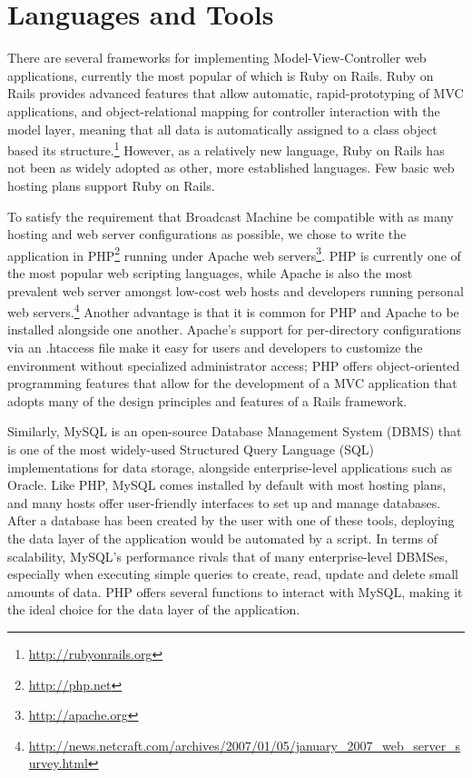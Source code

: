 \documentclass[a4paper,12pt]{report}
\begin{document}
\section{Languages and Tools}
There are several frameworks for implementing Model-View-Controller web applications, currently the most popular of which is Ruby on Rails. Ruby on Rails provides advanced features that allow automatic, rapid-prototyping of MVC applications, and object-relational mapping for controller interaction with the model layer, meaning that all data is automatically assigned to a class object based its structure.\footnote{\url{http://rubyonrails.org}} However, as a relatively new language, Ruby on Rails has not been as widely adopted as other, more established languages. Few basic web hosting plans support Ruby on Rails. 

To satisfy the requirement that Broadcast Machine be compatible with as many hosting and web server configurations as possible, we chose to write the application in PHP\footnote{\url{http://php.net}} running under Apache web servers\footnote{\url{http://apache.org}}. PHP is currently one of the most popular web scripting languages, while Apache is also the most prevalent web server amongst low-cost web hosts and developers running personal web servers.\footnote{\url{http://news.netcraft.com/archives/2007/01/05/january\_2007\_web\_server\_survey.html}}
Another advantage is that it is common for PHP and Apache to be installed alongside one another. Apache's support for per-directory configurations via an .htaccess file make it easy for users and developers to customize the environment without specialized administrator access; PHP offers object-oriented programming features that allow for the development of a MVC application that adopts many of the design principles and features of a Rails framework.

Similarly, MySQL is an open-source Database Management System (DBMS) that is one of the most widely-used Structured Query Language (SQL) implementations for data storage, alongside enterprise-level applications such as Oracle. Like PHP, MySQL comes installed by default with most hosting plans, and many hosts offer user-friendly interfaces to set up and manage databases. After a database has been created by the user with one of these tools, deploying the data layer of the application would be automated by a script. In terms of scalability, MySQL's performance rivals that of many enterprise-level DBMSes, especially when executing simple queries to create, read, update and delete small amounts of data. PHP offers several functions to interact with MySQL, making it the ideal choice for the data layer of the application.
\end{document}
